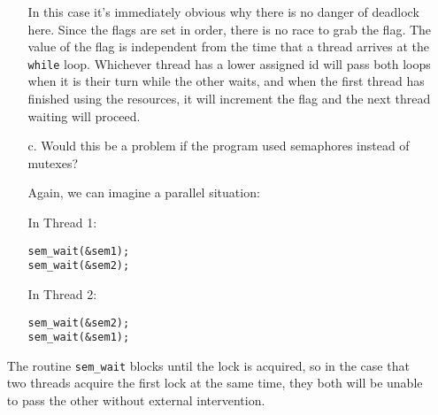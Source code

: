 \documentclass[11pt,epsfig,letterpaper]{article}
\begin{document}
\begin{enumerate}
\begin{enumerate}
                    \quad In this case it's immediately obvious why there is no danger of deadlock here. Since the flags are set in order, there is no race to grab the flag. The value of the flag is independent from the time that a thread arrives at the {\tt while} loop. Whichever thread has a lower assigned id will pass both loops when it is their turn while the other waits, and when the first thread has finished using the resources, it will increment the flag and the next thread waiting will proceed.

            \vspace{0.5pc}
            \item[c.] Would this be a problem if the program used semaphores instead of mutexes?

            \quad Again, we can imagine a parallel situation:
            \vspace{0.5pc}

                    In Thread 1:
\begin{verbatim}
sem_wait(&sem1);
sem_wait(&sem2);
\end{verbatim}

                    In Thread 2:
\begin{verbatim}
sem_wait(&sem2);
sem_wait(&sem1);
\end{verbatim}
            \end{enumerate}
            \vspace{0.5pc}

            \quad The routine {\tt sem\_wait} blocks until the lock is acquired, so in the case that two threads acquire the first lock at the same time, they both will be unable to pass the other without external intervention.
            \pagebreak





    \end{enumerate}
\end{document}
